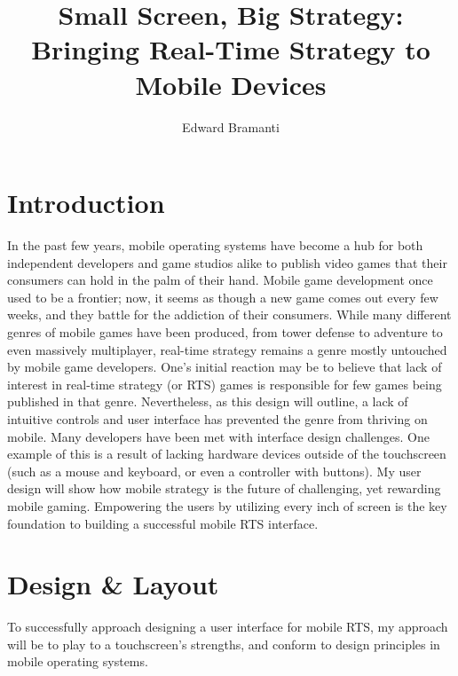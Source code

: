 \documentclass[11pt]{article}
\title{Small Screen, Big Strategy: Bringing Real-Time Strategy to Mobile Devices}
\author{Edward Bramanti}
\begin{document}
\maketitle
{}
\pagebreak
\section{Introduction}
In the past few years, mobile operating systems have become a hub for both independent developers and game studios alike to publish video games that their consumers can hold in the palm of their hand. Mobile game development once used to be a frontier; now, it seems as though a new game comes out every few weeks, and they battle for the addiction of their consumers. While many different genres of mobile games have been produced, from tower defense to adventure to even massively multiplayer, real-time strategy remains a genre mostly untouched by mobile game developers. One's initial reaction may be to believe that lack of interest in real-time strategy (or RTS) games is responsible for few games being published in that genre. Nevertheless, as this design will outline, a lack of intuitive controls and user interface has prevented the genre from thriving on mobile. Many developers have been met with interface design challenges. One example of this is a result of lacking hardware devices outside of the touchscreen (such as a mouse and keyboard, or even a controller with buttons). My user design will show how mobile strategy is the future of challenging, yet rewarding mobile gaming. Empowering the users by utilizing every inch of screen is the key foundation to building a successful mobile RTS interface.
\section{Design \& Layout}
To successfully approach designing a user interface for mobile RTS, my approach will be to play to a touchscreen's strengths, and conform to design principles in mobile operating systems.
\end{document}
